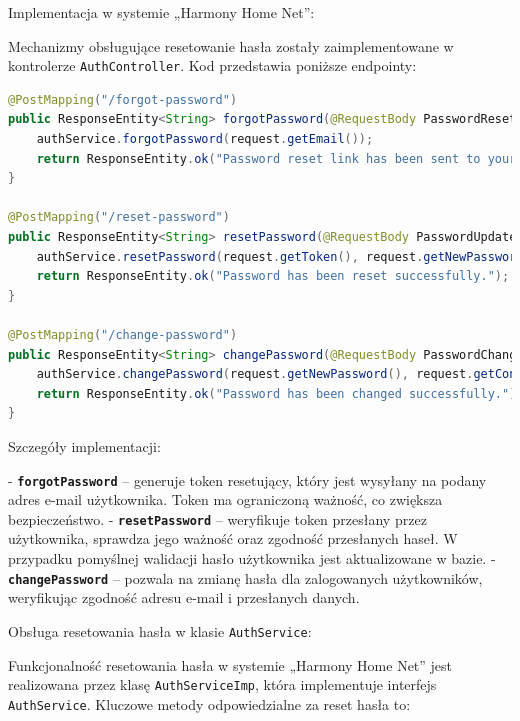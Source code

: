 Implementacja w systemie „Harmony Home Net”:

Mechanizmy obsługujące resetowanie hasła zostały zaimplementowane w kontrolerze \texttt{AuthController}. Kod przedstawia poniższe endpointy:

\begin{lstlisting}[language=Java, caption=Fragment klasy \texttt{AuthController}]
@PostMapping("/forgot-password")
public ResponseEntity<String> forgotPassword(@RequestBody PasswordResetRequest request) {
    authService.forgotPassword(request.getEmail());
    return ResponseEntity.ok("Password reset link has been sent to your email.");
}

@PostMapping("/reset-password")
public ResponseEntity<String> resetPassword(@RequestBody PasswordUpdateRequest request) {
    authService.resetPassword(request.getToken(), request.getNewPassword(), request.getConfirmPassword());
    return ResponseEntity.ok("Password has been reset successfully.");
}

@PostMapping("/change-password")
public ResponseEntity<String> changePassword(@RequestBody PasswordChangeRequest request) {
    authService.changePassword(request.getNewPassword(), request.getConfirmPassword(), request.getEmail());
    return ResponseEntity.ok("Password has been changed successfully.");
}
\end{lstlisting}

Szczegóły implementacji:

- \textbf{\texttt{forgotPassword}} -- generuje token resetujący, który jest wysyłany na podany adres e-mail użytkownika. Token ma ograniczoną ważność, co zwiększa bezpieczeństwo.
- \textbf{\texttt{resetPassword}} -- weryfikuje token przesłany przez użytkownika, sprawdza jego ważność oraz zgodność przesłanych haseł. W przypadku pomyślnej walidacji hasło użytkownika jest aktualizowane w bazie.
- \textbf{\texttt{changePassword}} -- pozwala na zmianę hasła dla zalogowanych użytkowników, weryfikując zgodność adresu e-mail i przesłanych danych.

Obsługa resetowania hasła w klasie \texttt{AuthService}:

Funkcjonalność resetowania hasła w systemie „Harmony Home Net” jest realizowana przez klasę \texttt{AuthServiceImp}, która implementuje interfejs \texttt{AuthService}. Kluczowe metody odpowiedzialne za reset hasła to:

